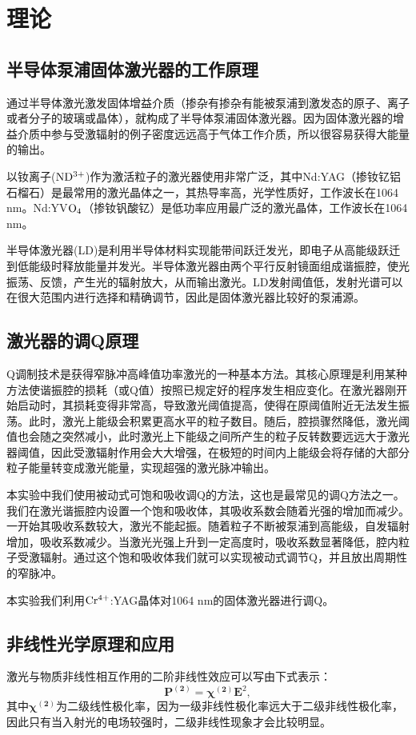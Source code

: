 \documentclass{mpltx}
\begin{document}
\section{理论\cite{book}}
\subsection{半导体泵浦固体激光器的工作原理}
通过半导体激光激发固体增益介质（掺杂有掺杂有能被泵浦到激发态的原子、离子或者分子的玻璃或晶体），就构成了半导体泵浦固体激光器。因为固体激光器的增益介质中参与受激辐射的例子密度远远高于气体工作介质，所以很容易获得大能量的输出。

以钕离子(${\rm ND^{3+}}$)作为激活粒子的激光器使用非常广泛，其中Nd:YAG（掺钕钇铝石榴石）是最常用的激光晶体之一，其热导率高，光学性质好，工作波长在1064 nm。Nd:YV${\rm O_4}$（掺钕钒酸钇）是低功率应用最广泛的激光晶体，工作波长在1064 nm。

半导体激光器(LD)是利用半导体材料实现能带间跃迁发光，即电子从高能级跃迁到低能级时释放能量并发光。半导体激光器由两个平行反射镜面组成谐振腔，使光振荡、反馈，产生光的辐射放大，从而输出激光。LD发射阈值低，发射光谱可以在很大范围内进行选择和精确调节，因此是固体激光器比较好的泵浦源。
\subsection{激光器的调Q原理}
Q调制技术是获得窄脉冲高峰值功率激光的一种基本方法。其核心原理是利用某种方法使谐振腔的损耗（或Q值）按照已规定好的程序发生相应变化。在激光器刚开始启动时，其损耗变得非常高，导致激光阈值提高，使得在原阈值附近无法发生振荡。此时，激光上能级会积累更高水平的粒子数目。随后，腔损骤然降低，激光阈值也会随之突然减小，此时激光上下能级之间所产生的粒子反转数要远远大于激光器阈值，因此受激辐射作用会大大增强，在极短的时间内上能级会将存储的大部分粒子能量转变成激光能量，实现超强的激光脉冲输出。

本实验中我们使用被动式可饱和吸收调Q的方法，这也是最常见的调Q方法之一。我们在激光谐振腔内设置一个饱和吸收体，其吸收系数会随着光强的增加而减少。一开始其吸收系数较大，激光不能起振。随着粒子不断被泵浦到高能级，自发辐射增加，吸收系数减少。当激光光强上升到一定高度时，吸收系数显著降低，腔内粒子受激辐射。通过这个饱和吸收体我们就可以实现被动式调节Q，并且放出周期性的窄脉冲。

本实验我们利用${\rm Cr^{4+}}$:YAG晶体对1064 nm的固体激光器进行调Q。
\subsection{非线性光学原理和应用}
激光与物质非线性相互作用的二阶非线性效应可以写由下式表示：
\begin{equation}
  \bm{P^{(2)}}=\bm{\chi^{(2)}}\bm{E}^2,
\end{equation}
其中$\bm{\chi^{(2)}}$为二级线性极化率，因为一级非线性极化率远大于二级非线性极化率，因此只有当入射光的电场较强时，二级非线性现象才会比较明显。
\end{document}
